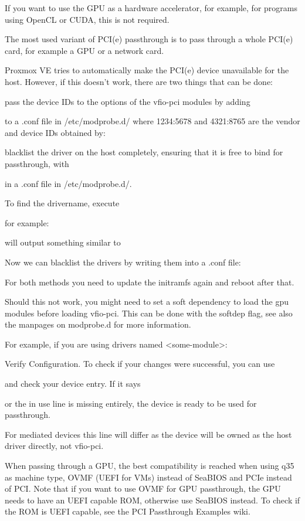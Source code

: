 If you want to use the GPU as a hardware accelerator, for example, for programs using OpenCL or CUDA, this is not required.

The most used variant of PCI(e) passthrough is to pass through a whole PCI(e) card, for example a GPU or a network card.

Proxmox VE tries to automatically make the PCI(e) device unavailable for the host. However, if this doesn’t work, there are two things that can be done:

pass the device IDs to the options of the vfio-pci modules by adding

to a .conf file in /etc/modprobe.d/ where 1234:5678 and 4321:8765 are the vendor and device IDs obtained by:

blacklist the driver on the host completely, ensuring that it is free to bind for passthrough, with

in a .conf file in /etc/modprobe.d/.

To find the drivername, execute

for example:

will output something similar to

Now we can blacklist the drivers by writing them into a .conf file:

For both methods you need to update the initramfs again and reboot after that.

Should this not work, you might need to set a soft dependency to load the gpu modules before loading vfio-pci. This can be done with the softdep flag, see also the manpages on modprobe.d for more information.

For example, if you are using drivers named <some-module>:

Verify Configuration. To check if your changes were successful, you can use

and check your device entry. If it says

or the in use line is missing entirely, the device is ready to be used for passthrough.

For mediated devices this line will differ as the device will be owned as the host driver directly, not vfio-pci.

When passing through a GPU, the best compatibility is reached when using q35 as machine type, OVMF (UEFI for VMs) instead of SeaBIOS and PCIe instead of PCI. Note that if you want to use OVMF for GPU passthrough, the GPU needs to have an UEFI capable ROM, otherwise use SeaBIOS instead. To check if the ROM is UEFI capable, see the PCI Passthrough Examples wiki.

